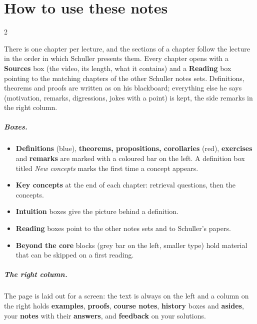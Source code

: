 \documentclass[12pt,oneside,openany]{book}
\begin{document}
\chapter*{How to use these notes}
\begin{paracol}{2}

There is one chapter per lecture, and the sections of a chapter follow the lecture in the order in which
Schuller presents them. Every chapter opens with a \textbf{Sources} box (the video, its length, what it
contains) and a \textbf{Reading} box pointing to the matching chapters of the other Schuller notes sets.
Definitions, theorems and proofs are written as on his blackboard; everything else he says (motivation,
remarks, digressions, jokes with a point) is kept, the side remarks in the right column.

\paragraph{Boxes.}
\begin{itemize}
  \item \textcolor{defcol}{\textbf{Definitions}} (blue), \textcolor{thmcol}{\textbf{theorems, propositions, corollaries}} (red),
        \textcolor{exercol}{\textbf{exercises}} and \textcolor{srccol}{\textbf{remarks}} are marked with a
        coloured bar on the left. A definition box titled \emph{New concepts} marks the first time a concept appears.
  \item \textcolor{keycol}{\textbf{Key concepts}} at the end of each chapter: retrieval questions, then the concepts.
  \item \textcolor{intucol}{\textbf{Intuition}} boxes give the picture behind a definition.
  \item \textcolor{srccol}{\textbf{Reading}} boxes point to the other notes sets and to Schuller's papers.
  \item \textbf{Beyond the core} blocks (grey bar on the left, smaller type) hold material that can be
        skipped on a first reading.
\end{itemize}

\paragraph{The right column.} The page is laid out for a screen: the text is always on the left and a
column on the right holds \textcolor{intcol}{\textbf{examples}}, \textcolor{thmcol}{\textbf{proofs}},
\textcolor{srccol}{\textbf{course notes}}, \textcolor{histcol}{\textbf{history}} boxes and
\textcolor{histcol}{\textbf{asides}}, your \textcolor{notecol!80!black}{\textbf{notes}} with their
\textcolor{anscol}{\textbf{answers}}, and \textcolor{exercol}{\textbf{feedback}} on your solutions.


\end{paracol}
\end{document}
